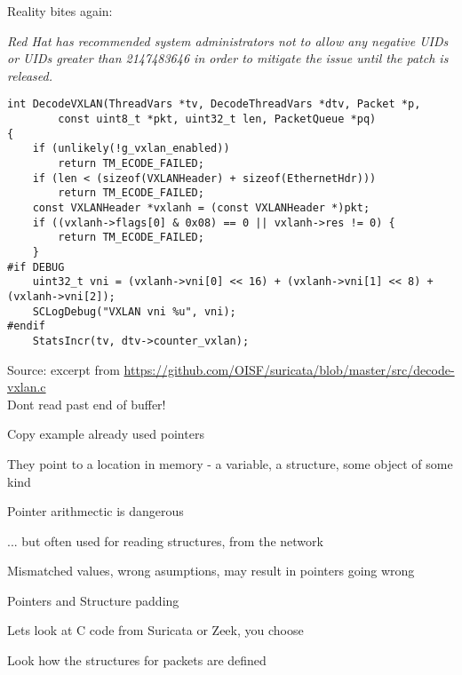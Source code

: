 \documentclass[Screen16to9,17pt]{foils}
\begin{document}
\begin{list2}
\item Reality bites again:\\
\item \emph{Red Hat has recommended system administrators not to allow any negative UIDs or UIDs greater than 2147483646 in order to mitigate the issue until the patch is released.}
\end{list2}




\begin{verbatim}
int DecodeVXLAN(ThreadVars *tv, DecodeThreadVars *dtv, Packet *p,
        const uint8_t *pkt, uint32_t len, PacketQueue *pq)
{
    if (unlikely(!g_vxlan_enabled))
        return TM_ECODE_FAILED;
    if (len < (sizeof(VXLANHeader) + sizeof(EthernetHdr)))
        return TM_ECODE_FAILED;
    const VXLANHeader *vxlanh = (const VXLANHeader *)pkt;
    if ((vxlanh->flags[0] & 0x08) == 0 || vxlanh->res != 0) {
        return TM_ECODE_FAILED;
    }
#if DEBUG
    uint32_t vni = (vxlanh->vni[0] << 16) + (vxlanh->vni[1] << 8) + (vxlanh->vni[2]);
    SCLogDebug("VXLAN vni %u", vni);
#endif
    StatsIncr(tv, dtv->counter_vxlan);
\end{verbatim}

Source: excerpt from \url{https://github.com/OISF/suricata/blob/master/src/decode-vxlan.c}\\
Dont read past end of buffer!


\begin{list2}
\item Copy example already used pointers
\item They point to a location in memory - a variable, a structure, some object of some kind
\item Pointer arithmectic is dangerous
\item ... but often used for reading structures, from the network
\item Mismatched values, wrong asumptions, may result in pointers going wrong
\end{list2}





\begin{list2}
\item Pointers and Structure padding
\item Lets look at C code from Suricata or Zeek, you choose
\item Look how the structures for packets are defined
\end{list2}
\end{document}
